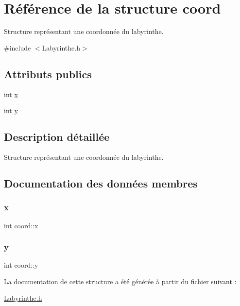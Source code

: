 \hypertarget{structcoord}{}\section{Référence de la structure coord}
\label{structcoord}


Structure représentant une coordonnée du labyrinthe.  




{\ttfamily \#include $<$Labyrinthe.\+h$>$}

\subsection*{Attributs publics}
\begin{DoxyCompactItemize}
\item 
int \hyperlink{structcoord_ac3e93ff628aa19d2888c5f6fa26f430d}{x}
\item 
int \hyperlink{structcoord_a2b099692d87f98e4844b615136ca37fb}{y}
\end{DoxyCompactItemize}


\subsection{Description détaillée}
Structure représentant une coordonnée du labyrinthe. 

\subsection{Documentation des données membres}
\mbox{\label{structcoord_ac3e93ff628aa19d2888c5f6fa26f430d}} 
\subsubsection{\texorpdfstring{x}{x}}
{\footnotesize\ttfamily int coord\+::x}

\mbox{\label{structcoord_a2b099692d87f98e4844b615136ca37fb}} 
\subsubsection{\texorpdfstring{y}{y}}
{\footnotesize\ttfamily int coord\+::y}



La documentation de cette structure a été générée à partir du fichier suivant \+:\begin{DoxyCompactItemize}
\item 
\hyperlink{Labyrinthe_8h}{Labyrinthe.\+h}\end{DoxyCompactItemize}
